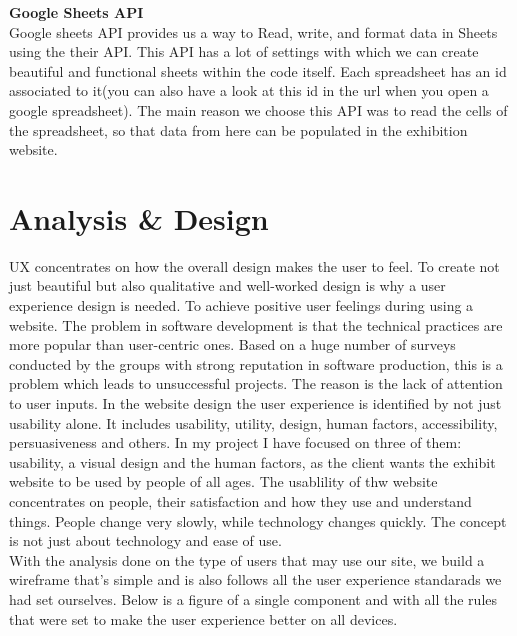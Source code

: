 \textbf{Google Sheets API}
\\
Google sheets API provides us a way to Read, write, and format data in Sheets using the their API. This API has a lot of settings with which we can create beautiful and functional sheets within the code itself. Each spreadsheet has an id associated to it(you can also have a look at this id in the url when you open a google spreadsheet).
The main reason we choose this API was to read the cells of the spreadsheet, so that data from here can be populated in the exhibition website.  

\section{Analysis \& Design}

UX concentrates on how the overall design makes the user to feel. To create not just
beautiful but also qualitative and well-worked design is why a user experience design
is needed. To achieve positive user feelings during using a website. The problem in software development is that the technical practices are more popular than user-centric ones. Based on a huge number of surveys conducted by the groups with strong reputation in software production, this is a problem which leads to unsuccessful projects. The reason is the lack of attention to user inputs. In the website design the user experience is identified by not just usability alone. It includes usability, utility, design, human factors, accessibility, persuasiveness and others. In my project I have focused on three of them: usability, a visual design and the human factors, as the client wants the exhibit website to be used by people of all ages. The usablility of thw website concentrates on people, their satisfaction and how they use and understand
things. People change very slowly, while technology changes quickly. The concept is
not just about technology and ease of use.
\\
With the analysis done on the type of users that may use our site, we build a wireframe that's simple and is also follows all the user experience standarads we had set ourselves. Below is a figure of a single component and with all the rules that were set to make the user experience better on all devices.

